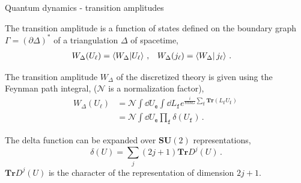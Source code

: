 \documentclass[12pt,titlepage]{article}
\begin{document}
\begin{frame}{Quantum dynamics - transition amplitudes}
    \begin{list}{\,}{\leftmargin=1em \itemindent=0em}
        \item<1-> The transition amplitude is a function of states defined on the boundary graph $\Gamma=\left(\partial\Delta\right)^\text{*}$ of a triangulation $\Delta$ of spacetime,
        \begin{align}
            W_\Delta(U_\ell)&=\braket{W_\Delta}{U_\ell}\,, &W_\Delta(j_\ell)&=\braket{W_\Delta}{\,j_\ell}\,.
        \end{align}
        \item<2-> The transition amplitude $W_\Delta$ of the discretized theory is given using the Feynman path integral, ($\mathcal{N}$ is a normalization factor),
        \begin{align}
            W_\Delta(U_\ell)&=\mathcal{N}\int\dd{U_\mathtt{e}}\int\dd{L_\mathtt{f}}e^{\frac{i}{8\pi\hbar G}\sum_\mathtt{f}\mathbf{Tr}(L_\mathtt{f} U_\mathtt{f})}\,\\
            &=\mathcal{N}\int\dd{U_\mathtt{e}}\prod_\mathtt{f}\delta(U_\mathtt{f})\,.
        \end{align}
        \item<3-> The delta function can be expanded over $\mathbf{SU}(2)$ representations,
        \begin{equation}
            \delta(U)=\sum_j(2j+1)\mathbf{Tr}D^{j}(U)\,.
        \end{equation}
        $\mathbf{Tr}D^{j}(U)$ is the character of the representation of dimension $2j+1$.
    \end{list}
\end{frame}
\end{document}
